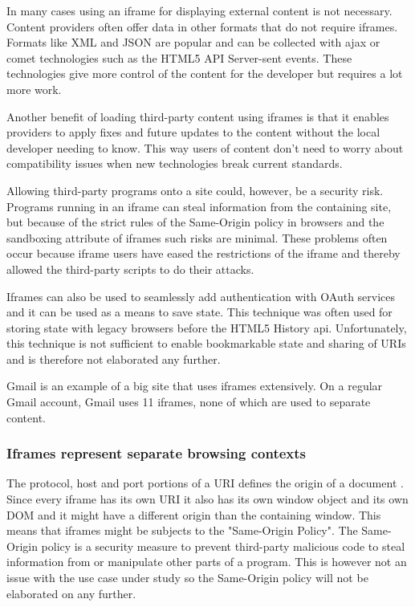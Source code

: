 \documentclass[english]{ifimaster}
\begin{document}
In many cases using an iframe for displaying external content is not necessary. Content providers often offer data in other formats that do not require iframes. Formats like XML and JSON are popular and can be collected with ajax or comet technologies such as the HTML5 API Server-sent events. These technologies give more control of the content for the developer but requires a lot more work.

Another benefit of loading third-party content using iframes is that it enables providers to apply fixes and future updates to the content without the local developer needing to know. This way users of content don't need to worry about compatibility issues when new technologies break current standards.

Allowing third-party programs onto a site could, however, be a security risk. Programs running in an iframe can steal information from the containing site, but because of the strict rules of the Same-Origin policy in browsers and the sandboxing attribute of iframes such risks are minimal. These problems often occur because iframe users have eased the restrictions of the iframe and thereby allowed the third-party scripts to do their attacks. 

Iframes can also be used to seamlessly add authentication with OAuth services and it can be used as a means to save state. This technique was often used for storing state with legacy browsers before the HTML5 History api. Unfortunately, this technique is not sufficient to enable bookmarkable state and sharing of URIs and is therefore not elaborated any further. 

Gmail is an example of a big site that uses iframes extensively. On a regular Gmail account, Gmail uses 11 iframes, none of which are used to separate content.

\subsubsection{Iframes represent separate browsing contexts}
The protocol, host and port portions of a URI defines the origin of a document \parencite{flanagan}. Since every iframe has its own URI it also has its own window object and its own DOM and it might have a different origin than the containing window. This means that iframes might be subjects to the "Same-Origin Policy". The Same-Origin policy is a security measure to prevent third-party malicious code to steal information from or manipulate other parts of a program. This is however not an issue with the use case under study so the Same-Origin policy will not be elaborated on any further.
\end{document}
